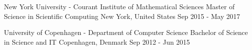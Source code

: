 

\begin{cventries}

  \cventryedu
    {New York University - Courant Institute of Mathematical Sciences} %
    {Master of Science in Scientific Computing} %
    {New York, United States} %
    {Sep 2015 - May 2017}

  \cventryedu
    {University of Copenhagen - Department of Computer Science} %
    {Bachelor of Science in Science and IT} %
    {Copenhagen, Denmark} %
    {Sep 2012 - Jun 2015}

\end{cventries}
